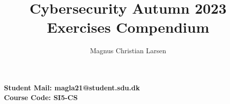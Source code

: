 \documentclass{article}
\title{%
    \bf{Cybersecurity Autumn 2023} \\
    \large Exercises Compendium
}
\author{Magnus Christian Larsen}
\begin{document}
\lstset{
    frame=shadowbox,
    numberstyle=\footnotesize,
    frame=single,
    breaklines=true
}


\maketitle
\vspace*{\fill}
\begin{center}
    \bf{%
        Student Mail:} magla21@student.sdu.dk \\
    \bf{%
        Course Code: SI5-CS \\
    }
\end{center}
\newpage
\tableofcontents
\newpage








\end{document}
